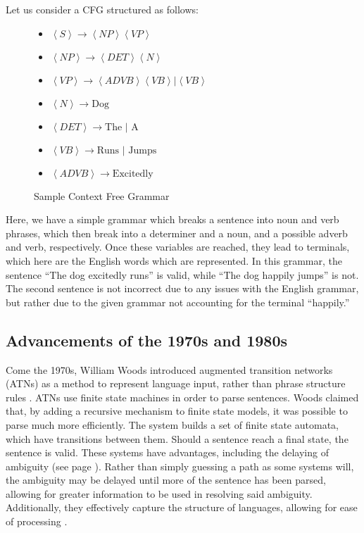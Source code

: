 Let us consider a CFG structured as follows:

\begin{center}
\begin{figure}[H]
\begin{center}

\begin{itemize}

	\item $\left<S\right> \rightarrow \left< NP \right> \left<VP\right>$
	\item $\left<NP\right> \rightarrow \left<DET\right> \left<N\right>$
	\item $\left<VP\right> \rightarrow \left<ADVB\right> \left<VB\right> | \left<VB\right>$
	\item $\left<N\right> \rightarrow \text{Dog}$
	\item $\left<DET\right> \rightarrow \text{The | A}$
	\item $\left<VB\right> \rightarrow \text{Runs | Jumps}$
	\item $\left<ADVB\right> \rightarrow \text{Excitedly}$

\end{itemize}
\end{center}
\caption{Sample Context Free Grammar}
\end{figure}
\end{center}

\noindent
Here, we have a simple grammar which breaks a sentence into noun and verb phrases, which then break into a determiner and a noun, and a possible adverb and verb, respectively. Once these variables are reached, they lead to terminals, which here are the English words which are represented. In this grammar, the sentence ``The dog excitedly runs'' is valid, while ``The dog happily jumps'' is not. The second sentence is not incorrect due to any issues with the English grammar, but rather due to the given grammar not accounting for the terminal ``happily.''



\subsection{Advancements of the 1970s and 1980s}

Come the 1970s, William Woods introduced augmented transition networks (ATNs) as a method to represent language input, rather than phrase structure rules \cite{Woods}. ATNs use finite state machines in order to parse sentences. Woods claimed that, by adding a recursive mechanism to finite state models, it was possible to parse much more efficiently. The system builds a set of finite state automata, which have transitions between them. Should a sentence reach a final state, the sentence is valid. These systems have advantages, including the delaying of ambiguity (see page \pageref{issues}). Rather than simply guessing a path as some systems will, the ambiguity may be delayed until more of the sentence has been parsed, allowing for greater information to be used in resolving said ambiguity. Additionally, they effectively capture the structure of languages, allowing for ease of processing \cite{Woods}.

